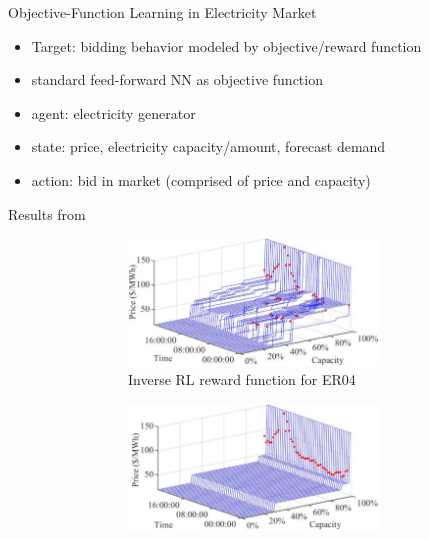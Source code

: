 \documentclass[12pt]{beamer}
\begin{document}
\begin{frame}{Objective-Function Learning in Electricity Market~\parencite{objective_function_meta}}
  \begin{itemize}
    \item Target: bidding behavior modeled by objective/reward function
    \item standard feed-forward NN as objective function
    \pause
    \item agent: electricity generator
    \item state: price, electricity capacity/amount, forecast demand
    \item action: bid in market (comprised of price and capacity)
  \end{itemize}
\end{frame}

\begin{frame}{Results from \parencite{objective_function_meta}}
  \begin{figure}[h!]
    \begin{subfigure}{0.4\textwidth}
      \centering
      \begin{subfigure}{\textwidth}
        \includegraphics[width=0.95\textwidth]{./identified_vs_assumed_01_1.png}
        \caption{Inverse RL reward function for ER04}
      \end{subfigure}
      \begin{subfigure}{\textwidth}
        \includegraphics[width=0.95\textwidth]{./identified_vs_assumed_01_2.png}

\end{subfigure}
\end{subfigure}
\end{figure}
\end{frame}
\end{document}
